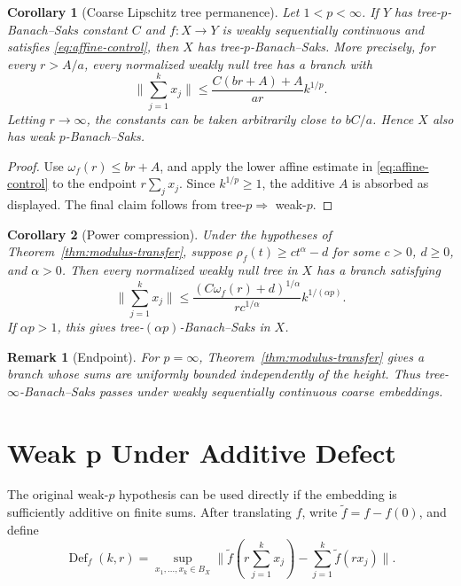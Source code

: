 \documentclass[11pt]{article}
\newtheorem{corollary}{Corollary}
\newtheorem{remark}{Remark}
\newcommand{\Def}{\operatorname{Def}}
\newcommand{\norm}[1]{\lVert #1\rVert}
\begin{document}
\begin{corollary}[Coarse Lipschitz tree permanence]\label{cor:CL-tree-transfer}
Let \(1<p<\infty\).  If \(Y\) has tree-\(p\)-Banach--Saks constant \(C\) and
\(f:X\to Y\) is weakly sequentially continuous and satisfies
\eqref{eq:affine-control}, then \(X\) has tree-\(p\)-Banach--Saks.  More
precisely, for every \(r>A/a\), every normalized weakly null tree has a branch
with
\[
 \norm{\sum_{j=1}^k x_j}
 \le \frac{C(br+A)+A}{ar}k^{1/p}.
\]
Letting \(r\to\infty\), the constants can be taken arbitrarily close to
\(bC/a\).  Hence \(X\) also has weak \(p\)-Banach--Saks.
\end{corollary}

\begin{proof}
Use \(\omega_f(r)\le br+A\), and apply the lower affine estimate in
\eqref{eq:affine-control} to the endpoint \(r\sum_jx_j\).  Since
\(k^{1/p}\ge1\), the additive \(A\) is absorbed as displayed.  The final
claim follows from tree-\(p\Rightarrow\) weak-\(p\).
\end{proof}

\begin{corollary}[Power compression]\label{cor:power-compression}
Under the hypotheses of Theorem~\ref{thm:modulus-transfer}, suppose
\(\rho_f(t)\ge ct^\alpha-d\) for some \(c>0\), \(d\ge0\), and \(\alpha>0\).
Then every normalized weakly null tree in \(X\) has a branch satisfying
\[
 \norm{\sum_{j=1}^k x_j}
 \le
 \frac{(C\omega_f(r)+d)^{1/\alpha}}{r c^{1/\alpha}}
 k^{1/(\alpha p)}.
\]
If \(\alpha p>1\), this gives tree-\((\alpha p)\)-Banach--Saks in \(X\).
\end{corollary}

\begin{remark}[Endpoint]
For \(p=\infty\), Theorem~\ref{thm:modulus-transfer} gives a branch whose
sums are uniformly bounded independently of the height.  Thus
tree-\(\infty\)-Banach--Saks passes under weakly sequentially continuous
coarse embeddings.
\end{remark}

\section*{Weak p Under Additive Defect}

The original weak-\(p\) hypothesis can be used directly if the embedding is
sufficiently additive on finite sums.  After translating \(f\), write
\(\widetilde f=f-f(0)\), and define
\[
 \Def_f(k,r)=\sup_{x_1,\ldots,x_k\in B_X}
 \norm{
  \widetilde f(r\sum_{j=1}^k x_j)
  -\sum_{j=1}^k\widetilde f(rx_j)
 }.
\]
\end{document}
